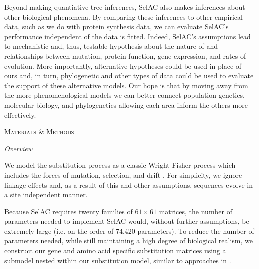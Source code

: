 \documentclass[12pt,letterpaper,fleqn]{article}
\renewcommand{\section}[1]{%
\bigskip
\begin{center}
\begin{Large}
\normalfont\scshape #1
\medskip
\end{Large}
\end{center}}
\renewcommand{\subsection}[1]{%
\bigskip
\begin{center}
\begin{large}
\normalfont\itshape #1
\end{large}
\end{center}}
\newcommand{\selac}{SelAC\xspace}
\begin{document}
Beyond making quantiative tree inferences, \selac also makes inferences about other biological phenomena.
By comparing these inferences to other empirical data, such as we do with protein synthesis data, we can evaluate \selac's performance independent of the data is fitted.
Indeed, \selac's assumptions lead to mechanistic and, thus, testable hypothesis about the nature of and relationships between mutation, protein function, gene expression, and rates of evolution.
More importantly, alternative hypotheses could be used in place of ours and, in turn, phylogenetic and other types of data could be used to evaluate the support of these alternative models.
Our hope is that by moving away from the more phenomenological models we can better connect population genetics, molecular biology, and phylogenetics allowing each area inform the others more effectively.

\section{Materials \& Methods}
\subsection{Overview}
We model the substitution process as a classic Wright-Fisher process which includes the forces of mutation, selection, and drift \citep{Fisher1930,Kimura1962,Wright1969,Iwasa1988,BergAndLassig2003,SellaAndHirsh2005,McCandlishAndStoltzfus2014}.
For simplicity, we ignore linkage effects and, as a result of this and other assumptions, sequences evolve in  a site independent manner.

Because \selac requires twenty families of $61 \times 61$ matrices, the number of parameters needed to implement \selac would, without further assumptions, be extremely large (i.e. on the order of 74,420 parameters).
To reduce the number of parameters needed, while still maintaining a high degree of biological realism, we construct our gene and amino acid specific substitution matrices using a submodel nested within our substitution model, similar to approaches in \citet{Gilchrist2007,ShahAndGilchrist2011,GilchristEtAl2015}.
\end{document}
